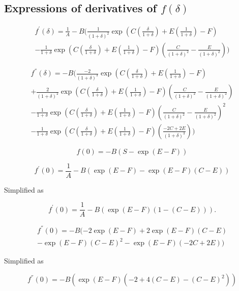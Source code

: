 \documentclass[12pt]{article}
\begin{document}
{\subsection{Expressions of derivatives of $f(\delta)$}

\begin{eqnarray}\label{eqn:32}
f^{'}(\delta)=\frac{1}{A}-B(\frac{1}{(1+\delta)^{2}}\exp(C (\frac{\delta}{1+\delta})+E(\frac{1}{1+
\delta})-F) \\ \nonumber
-\frac{1}{1+\delta}\exp(C (\frac{\delta}{1+\delta})+E(\frac{1}{1+\delta})-F)(\frac{C}{(1+\delta)^{2}}-\frac{E}{(1+\delta)^{2}}))
\end{eqnarray}


\begin{eqnarray}\label{eqn:33}
f^{''}(\delta)=-B(\frac{-2}{(1+\delta)^{3}}\exp(C (\frac{\delta}{1+\delta})+E(\frac{1}{1+\delta})-F) \\ \nonumber
+\frac{2}{(1+\delta)^{2}}\exp(C (\frac{\delta}{1+\delta})+E(\frac{1}{1+\delta})-F)(\frac{C}{(1+\delta)^{2}}-\frac{E}{(1+\delta)^{2}}) \\ \nonumber
-\frac{1}{1+\delta}\exp(C (\frac{\delta}{1+\delta})+E(\frac{1}{1+\delta})-F)(\frac{C}{(1+\delta)^{2}}-\frac{E}{(1+\delta)^{2}})^{2} \\ \nonumber
-\frac{1}{1+\delta}\exp(C (\frac{\delta}{1+\delta})+E(\frac{1}{1+\delta})-F)(\frac{-2C+2E}{(1+\delta)^{3}}))
\end{eqnarray}


\begin{equation}\label{eqn:34}
f(0)=-B(S-\exp(E-F))
\end{equation}

\begin{equation}\label{eqn:35}
f^{'}(0)=\frac{1}{A}-B(\exp(E-F)-\exp(E-F)(C-E))
\end{equation}

Simplified as 

\begin{equation}\label{eqn:36}
f^{'}(0)=\frac{1}{A}-B(\exp(E-F)(1-(C-E))).
\end{equation}

\begin{eqnarray}\label{eqn:37}
f^{''}(0)=-B(-2\exp(E-F)+2\exp(E-F)(C-E) \\ \nonumber
-\exp(E-F)(C-E)^{2}-\exp(E-F)(-2C+2E))
\end{eqnarray}

Simplified as 

\begin{equation}\label{eqn:38}
f^{''}(0)=-B(\exp(E-F)(-2+4(C-E)-(C-E)^2))
\end{equation}

}
\end{document}
